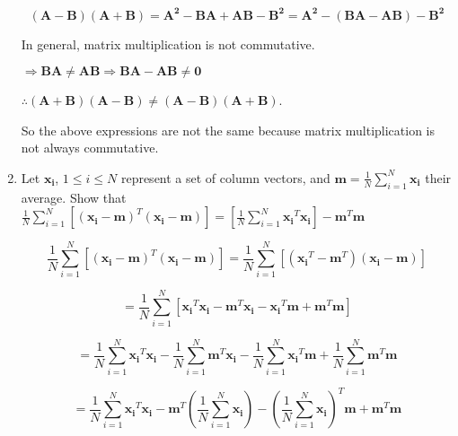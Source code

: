 \documentclass[fleqn]{article}
\begin{document}
\begin{enumerate}
		\begin{equation*}
		(\mathbf{A} - \mathbf{B})(\mathbf{A} + \mathbf{B}) = \mathbf{A^2} - \mathbf{B}\mathbf{A} + \mathbf{A}\mathbf{B} - \mathbf{B^2} = \mathbf{A^2} - (\mathbf{B}\mathbf{A} - \mathbf{A}\mathbf{B}) - \mathbf{B^2}
		\end{equation*}
		
		In general, matrix multiplication is not commutative.
		
		$\Rightarrow \mathbf{BA} \neq \mathbf{AB} \Rightarrow \mathbf{BA} - \mathbf{AB} \neq \mathbf{0}$
		
		$\therefore (\mathbf{A} + \mathbf{B})(\mathbf{A} - \mathbf{B}) \neq (\mathbf{A} - \mathbf{B})(\mathbf{A} + \mathbf{B})$.
		
		So the above expressions are not the same because matrix multiplication is not always commutative.
		
		\item Let $\mathbf{x_i}$, $1 \leq i \leq N$ represent a set of column vectors, and $\mathbf{m} = \frac{1}{N}\sum_{i=1}^{N}{\mathbf{x_i}}$ their average. Show that $\frac{1}{N}\sum_{i=1}^{N}\left[(\mathbf{x_i}-\mathbf{m})^T(\mathbf{x_i}-\mathbf{m})\right] = \left[\frac{1}{N}\sum_{i=1}^{N}{\mathbf{x_i}^T\mathbf{x_i}}\right]-\mathbf{m}^T\mathbf{m}$
		
		\begin{equation*}
			\frac{1}{N}\sum_{i=1}^{N}\left[(\mathbf{x_i}-\mathbf{m})^T(\mathbf{x_i}-\mathbf{m})\right] = \frac{1}{N}\sum_{i=1}^{N}\left[(\mathbf{x_i}^T-\mathbf{m}^T)(\mathbf{x_i}-\mathbf{m})\right]
		\end{equation*}
			
		\begin{equation*}
			 = \frac{1}{N}\sum_{i=1}^{N}\left[\mathbf{x_i}^T\mathbf{x_i}-\mathbf{m}^T\mathbf{x_i}-\mathbf{x_i}^T\mathbf{m}+\mathbf{m}^T\mathbf{m}\right]
		\end{equation*}
		
		\begin{equation*}
			 = \frac{1}{N}\sum_{i=1}^{N}{\mathbf{x_i}^T\mathbf{x_i}}-\frac{1}{N}\sum_{i=1}^{N}{\mathbf{m}^T\mathbf{x_i}}-\frac{1}{N}\sum_{i=1}^{N}{\mathbf{x_i}^T\mathbf{m}}+\frac{1}{N}\sum_{i=1}^{N}{\mathbf{m}^T\mathbf{m}}
		\end{equation*}
				
		\begin{equation*}
			 = \frac{1}{N}\sum_{i=1}^{N}{\mathbf{x_i}^T\mathbf{x_i}}-\mathbf{m}^T\left(\frac{1}{N}\sum_{i=1}^{N}{\mathbf{x_i}}\right)-\left(\frac{1}{N}\sum_{i=1}^{N}{\mathbf{x_i}}\right)^T\mathbf{m}+\mathbf{m}^T\mathbf{m}
		\end{equation*}
		

\end{enumerate}
\end{document}
